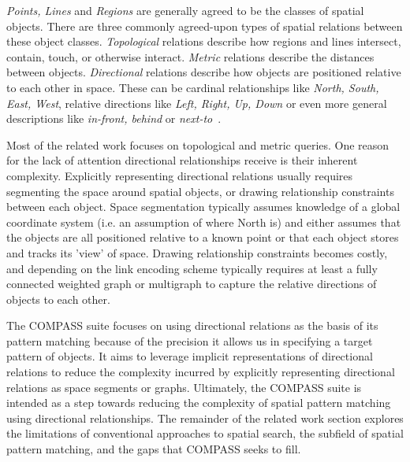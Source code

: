 \par{
    \textit{Points, Lines} and \textit{Regions} are generally agreed to be the classes of spatial objects. 
    There are three commonly agreed-upon types of spatial relations between these object classes. 
    \textit{Topological} relations describe how regions and lines intersect, contain, touch, or otherwise interact.
    \textit{Metric} relations describe the distances between objects. 
    \textit{Directional} relations describe how objects are positioned relative to each other in space.
    These can be cardinal relationships like \textit{North, South, East, West}, relative directions like \textit{Left, Right, Up, Down} or even more general descriptions like \textit{in-front, behind} or \textit{next-to}~\cite{Carniel2020,Bertella2022,Carniel2023}.
}
\par{Most of the related work focuses on topological and metric queries.
    One reason for the lack of attention directional relationships receive is their inherent complexity.
    Explicitly representing directional relations usually requires segmenting the space around spatial objects, or drawing relationship constraints between each object. 
    Space segmentation typically assumes knowledge of a global coordinate system (i.e. an assumption of where North is) and either assumes that the objects are all positioned relative to a known point or that each object stores and tracks its 'view' of space.  
    Drawing relationship constraints becomes costly, and depending on the link encoding scheme typically requires at least a fully connected weighted graph or multigraph to capture the relative directions of objects to each other.
}
\par{
    The COMPASS suite focuses on using directional relations as the basis of its pattern matching because of the precision it allows us in specifying a target pattern of objects.
    It aims to leverage implicit representations of directional relations to reduce the complexity incurred by explicitly representing directional relations as space segments or graphs. 
    Ultimately, the COMPASS suite is intended as a step towards reducing the complexity of spatial pattern matching using directional relationships.
    The remainder of the related work section explores the limitations of conventional approaches to spatial search, the subfield of spatial pattern matching, and the gaps that COMPASS seeks to fill.
}

